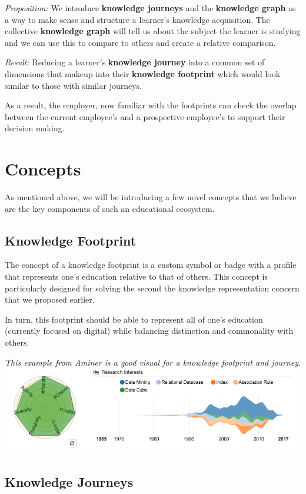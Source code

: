 \documentclass[]{book}
\theoremstyle{definition}
\theoremstyle{definition}
\theoremstyle{definition}
\theoremstyle{remark}
\begin{document}
\emph{Proposition:} We introduce \textbf{knowledge journeys} and the
\textbf{knowledge graph} as a way to make sense and structure a
learner's knowledge acquisition. The collective \textbf{knowledge graph}
will tell us about the subject the learner is studying and we can use
this to compare to others and create a relative comparison.

\emph{Result:} Reducing a learner's \textbf{knowledge journey} into a
common set of dimensions that makeup into their \textbf{knowledge
footprint} which would look similar to those with similar journeys.

As a result, the employer, now familiar with the footprints can check
the overlap between the current employee's and a prospective employee's
to support their decision making.

\chapter{Concepts}\label{concepts}

As mentioned above, we will be introducing a few novel concepts that we
believe are the key components of such an educational ecosystem.

\section{Knowledge Footprint}\label{knowledge-footprint}

The concept of a knowledge footprint is a custom symbol or badge with a
profile that represents one's education relative to that of others. This
concept is particularly designed for solving the second the knowledge
representation concern that we proposed earlier.

In turn, this footprint should be able to represent all of one's
education (currently focused on digital) while balancing distinction and
commonality with others.

\emph{This example from Aminer is a good visual for a knowledge
footprint and journey.} \includegraphics{img/aminer.png}

\section{Knowledge Journeys}\label{knowledge-journeys}
\end{document}
